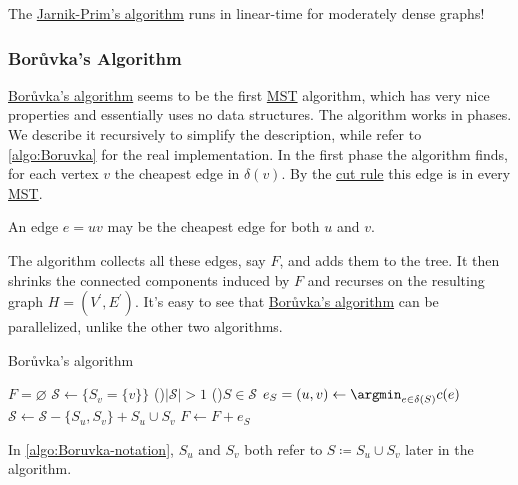 \begin{remark}
	The \hyperref[algo:Jarnik-Prim]{Jarnik-Prim's algorithm} runs in linear-time for moderately dense graphs!
\end{remark}

\subsubsection{Borůvka's Algorithm}
\hyperref[algo:Boruvka]{Borůvka's algorithm} seems to be the first \hyperref[prb:MST]{MST} algorithm, which has very nice properties and essentially uses no data structures. The algorithm works in phases. We describe it recursively to simplify the description, while refer to \autoref{algo:Boruvka} for the real implementation. In the first phase the algorithm finds, for each vertex \(v\) the cheapest edge in \(\delta (v)\). By the \hyperref[lma:cut-rule]{cut rule} this edge is in every \hyperref[prb:MST]{MST}.

\begin{note}
	An edge \(e = uv\) may be the cheapest edge for both \(u\) and \(v\).
\end{note}

The algorithm collects all these edges, say \(F\), and adds them to the tree. It then shrinks the connected components induced by \(F\) and recurses on the resulting graph \(H = (V^{\prime}  , E^{\prime} )\). It's easy to see that \hyperref[algo:Boruvka]{Borůvka's algorithm} can be parallelized, unlike the other two algorithms.

\begin{algorithm}[H]\label{algo:Boruvka}
	\DontPrintSemicolon
	\caption{Borůvka's algorithm}
	\BlankLine

	\(F = \varnothing \)
	\(\mathcal{S} \gets \{ S_v = \{ v \} \} \)
	\While(){\(\lvert \mathcal{S} \rvert > 1\)}{
		\For(){\(S \in \mathcal{S} \)}{
			\(e_S = (u, v) \gets \argmin_{e \in \delta (S)} c(e)\)\;
			\(\mathcal{S} \gets \mathcal{S} - \{ S_u, S_v \} + S_u \cup S_v\)\label{algo:Boruvka-notation}
			\(F \gets F + e_S\)
		}
	}
	\;
\end{algorithm}

\begin{notation}
	In \autoref{algo:Boruvka-notation}, \(S_u\) and \(S_v\) both refer to \(S \coloneqq S_u \cup S_v\) later in the algorithm.
\end{notation}

